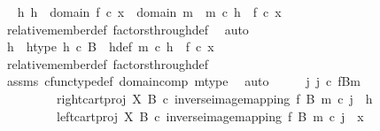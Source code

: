 \begin{isabellebody}
\ \isamarkupfalse%
\ {\isachardoublequoteopen}{\isasymexists}h{\isachardot}{\kern0pt}\ h\ {\isacharcolon}{\kern0pt}\ domain\ {\isacharparenleft}{\kern0pt}f\ {\isasymcirc}\isactrlsub c\ x{\isacharparenright}{\kern0pt}\ {\isasymrightarrow}\ domain\ m\ {\isasymand}\ m\ {\isasymcirc}\isactrlsub c\ h\ {\isacharequal}{\kern0pt}\ f\ {\isasymcirc}\isactrlsub c\ x{\isachardoublequoteclose}\isanewline
\ \ \ \ \isamarkupfalse%
\ relative{\isacharunderscore}{\kern0pt}member{\isacharunderscore}{\kern0pt}def{}\ factors{\isacharunderscore}{\kern0pt}through{\isacharunderscore}{\kern0pt}def\ \isamarkupfalse%
\ auto\isanewline
\ \ \isamarkupfalse%
\ \isamarkupfalse%
\ h\ \ h{\isacharunderscore}{\kern0pt}type{\isacharcolon}{\kern0pt}\ {\isachardoublequoteopen}h\ {\isasymin}\isactrlsub c\ B{\isachardoublequoteclose}\ \ h{\isacharunderscore}{\kern0pt}def{\isacharcolon}{\kern0pt}\ {\isachardoublequoteopen}m\ {\isasymcirc}\isactrlsub c\ h\ {\isacharequal}{\kern0pt}\ f\ {\isasymcirc}\isactrlsub c\ x{\isachardoublequoteclose}\isanewline
\ \ \ \ \isamarkupfalse%
\ relative{\isacharunderscore}{\kern0pt}member{\isacharunderscore}{\kern0pt}def{}\ factors{\isacharunderscore}{\kern0pt}through{\isacharunderscore}{\kern0pt}def\ \isanewline
\ \ \ \ \isamarkupfalse%
\ assms\ cfunc{\isacharunderscore}{\kern0pt}type{\isacharunderscore}{\kern0pt}def\ domain{\isacharunderscore}{\kern0pt}comp\ m{\isacharunderscore}{\kern0pt}type\ \isamarkupfalse%
\ auto\isanewline
\ \ \isamarkupfalse%
\ \isamarkupfalse%
\ {\isachardoublequoteopen}{\isasymexists}j{\isachardot}{\kern0pt}\ j\ {\isasymin}\isactrlsub c\ {\isacharparenleft}{\kern0pt}f\isactrlsup {\isacharminus}{\kern0pt}B{\isasymrparr}\isactrlbsub m\isactrlesub {\isacharparenright}{\kern0pt}\ {\isasymand}\isanewline
\ \ \ \ \ \ \ \ \ {\isacharparenleft}{\kern0pt}right{\isacharunderscore}{\kern0pt}cart{\isacharunderscore}{\kern0pt}proj\ X\ B\ {\isasymcirc}\isactrlsub c\ inverse{\isacharunderscore}{\kern0pt}image{\isacharunderscore}{\kern0pt}mapping\ f\ B\ m{\isacharparenright}{\kern0pt}\ {\isasymcirc}\isactrlsub c\ j\ {\isacharequal}{\kern0pt}\ h\ {\isasymand}\isanewline
\ \ \ \ \ \ \ \ \ {\isacharparenleft}{\kern0pt}left{\isacharunderscore}{\kern0pt}cart{\isacharunderscore}{\kern0pt}proj\ X\ B\ {\isasymcirc}\isactrlsub c\ inverse{\isacharunderscore}{\kern0pt}image{\isacharunderscore}{\kern0pt}mapping\ f\ B\ m{\isacharparenright}{\kern0pt}\ {\isasymcirc}\isactrlsub c\ j\ {\isacharequal}{\kern0pt}\ x{\isachardoublequoteclose}\isanewline

\end{isabellebody}
